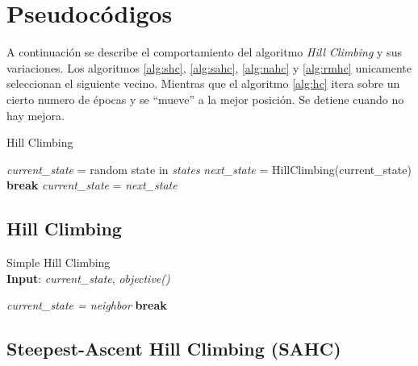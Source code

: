 \documentclass[12pt,twoside]{article}
\begin{document}
	\clearpage
	\section{Pseudocódigos}
	
	A continuación se describe el comportamiento del algoritmo \textit{Hill Climbing} y sus variaciones. Los algoritmos \ref{alg:shc}, \ref{alg:sahc}, \ref{alg:nahc} y \ref{alg:rmhc} unicamente seleccionan el siguiente vecino. Mientras que el algoritmo \ref{alg:hc} itera sobre un cierto numero de épocas y se ``mueve'' a la mejor posición. Se detiene cuando no hay mejora.
	
	\begin{algorithm}[H]
		\caption{Hill Climbing}
		\begin{algorithmic}[1]
			\State \textit{current\_state} = random state in \textit{states}
			\State \textit{next\_state} = HillClimbing(current\_state)
			\State \textbf{break}
			\EndIf 
			\State \textit{current\_state} = \textit{next\_state}
			\EndFor\\
		\end{algorithmic}
		\label{alg:hc}
	\end{algorithm}
	
	\subsection{Hill Climbing}
	
	\begin{algorithm}[H]
		\caption{Simple Hill Climbing \\ \textbf{Input}: \textit{current\_state}, \textit{objective()}}
		\begin{algorithmic}[1]
			\State \textit{current\_state = neighbor} 
			\State \textbf{break}
			\EndIf
			\EndFor\\
		\end{algorithmic}
		\label{alg:shc}
	\end{algorithm}
	
	\subsection{Steepest-Ascent Hill Climbing (SAHC)}
\end{document}
